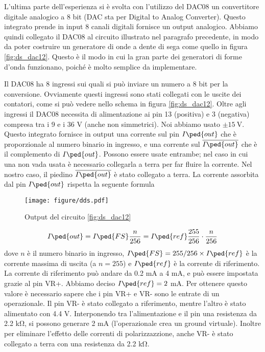 L'ultima parte dell'esperienza si è svolta con l'utilizzo del DAC08 un convertitore digitale
analogico a 8 bit  (DAC sta per Digital to Analog Converter). Questo integrato prende in input 8 canali digitali
fornisce un output analogico. Abbiamo quindi collegato il DAC08 al circuito illustrato nel paragrafo precedente,
in modo da poter costruire un generatore di onde a dente di sega come quello in
figura \ref{fig:ds_dac12}. Questo è il modo in cui la gran parte dei
generatori di forme d'onda funzionano, poiché è molto semplice da implementare.

Il DAC08 ha 8 ingressi sui quali si può inviare un numero a 8 bit per la conversione.
Ovviamente questi ingressi sono stati collegati con le uscite dei contatori, come si può vedere nello
schema in figura \ref{fig:ds_dac12}.
Oltre agli ingressi il DAC08 necessita di alimentazione ai pin 13 (positiva)
e 3 (negativa) compresa tra i 9 e i 36 V (anche non simmetrici). Noi abbiamo usato $\pm \SI{15}{\volt}$. 
Questo integrato fornisce in output una corrente
sul pin $I\ped{out}$ che è proporzionale al numero binario in ingresso, e una corrente sul $\overline{I\ped{out}}$ che è il complemento
di $I\ped{out}$. Possono essere usate entrambe; nel caso in cui una non vada usata è necessario collegarla
a terra per far fluire la corrente. Nel nostro caso, il piedino $\overline{I\ped{out}}$ è stato collegato a terra.
La corrente assorbita dal pin $I\ped{out}$ rispetta la seguente formula

\begin{figure}[b!]
    \texttt{[image: figure/dds.pdf]}
    \caption{Output del circuito \ref{fig:ds_dac12}}
    \label{fig:dds12}
\end{figure}

\begin{equation}
	I\ped{out} = I\ped{FS} \frac{n}{256} = I\ped{ref} \frac{255}{256} \cdot \frac{n}{256}
\end{equation}
%
dove $n$ è il numero binario in ingresso, $I\ped{FS} = 255/256 \times I\ped{ref}$ è la corrente massima di uscita (a $n = 255$)
e $I\ped{ref}$ è la corrente di riferimento. La corrente di riferimento può andare da 0.2 mA a 4 mA, e può essere impostata
grazie al pin VR+. Abbiamo deciso $I\ped{ref} = 2$ mA. Per ottenere questo valore è necessario sapere che
i pin VR+ e VR- sono le entrate di un operazionale. Il pin VR- è stato collegato a riferimento, mentre l'altro è stato alimentato
con 4.4 V. Interponendo tra l'alimentazione e il pin una resistenza da 2.2 \si{\kilo\ohm}, si possono generare 2 mA (l'operazionale crea un
ground virtuale). Inoltre per eliminare l'effetto delle correnti di polarizzazzione, anche VR- è stato collegato a terra con una resistenza
da 2.2 \si{\kilo\ohm}.

